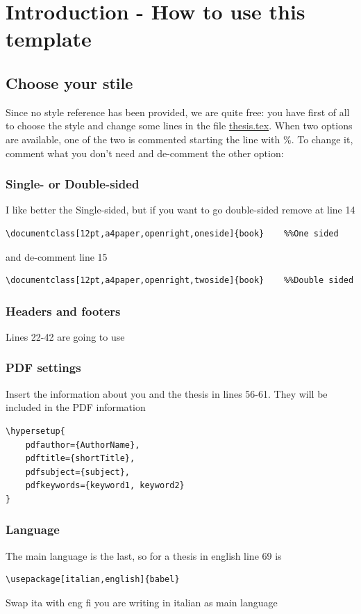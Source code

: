 \chapter{Introduction - How to use this template}

\section{Choose your stile}

Since no style reference has been provided, we are quite free: you have first of all to choose the style and change some lines in the file \url{thesis.tex}. When two options are available, one of the two is commented starting the line with \%. To change it, comment what you don't need and de-comment the other option:

\subsection{Single- or Double-sided}
I like better the Single-sided, but if you want to go double-sided remove at line 14
\begin{verbatim}
\documentclass[12pt,a4paper,openright,oneside]{book}	%%One sided
\end{verbatim}
and de-comment line 15
\begin{verbatim}
\documentclass[12pt,a4paper,openright,twoside]{book}	%%Double sided
\end{verbatim}

\subsection{Headers and footers}
Lines 22-42 are going to use


\subsection{PDF settings}
Insert the information about you and the thesis in lines 56-61. They will be included in the PDF information
\begin{verbatim}
\hypersetup{
    pdfauthor={AuthorName},
    pdftitle={shortTitle},
    pdfsubject={subject},
    pdfkeywords={keyword1, keyword2}
}
\end{verbatim}

\subsection{Language}
The main language is the last, so for a thesis in english line 69 is
\begin{verbatim}
\usepackage[italian,english]{babel} 
\end{verbatim}
Swap ita with eng fi you are writing in italian as main language





